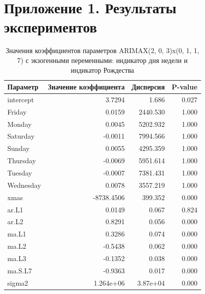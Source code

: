 ﻿

\chapter{Приложение 1. Результаты экспериментов}

\begin{table}%
    \caption{Значения коэффициентов параметров ARIMAX(2, 0, 3)x(0, 1, 1, 7) с экзогенными переменными: индикатор дня недели и индикатор Рождества}
    \centering
    \begin{tabular}{|l|r||r|r|}
        \hline
            Параметр           &     Значение коэффициента  &  Дисперсия  &  P-value \\
        \hline
            intercept          &     3.7294                 &     1.686 &   0.027 \\
            Friday             &     0.0159                 &  2440.530 &   1.000 \\
            Monday             &     0.0045                 &  5202.932 &   1.000 \\
            Saturday           &    -0.0011                 &  7994.566 &   1.000 \\
            Sunday             &     0.0055                 &  4295.359 &   1.000 \\
            Thursday           &    -0.0069                 &  5951.614 &   1.000 \\
            Tuesday            &    -0.0007                 &  7381.431 &   1.000 \\
            Wednesday          &     0.0078                 &  3557.219 &   1.000 \\
            xmas               & -8738.4506                 &   399.352 &   0.000 \\
            ar.L1              &     0.0149                 &     0.067 &   0.824 \\
            ar.L2              &     0.8291                 &     0.056 &   0.000 \\
            ma.L1              &     0.3286                 &     0.074 &   0.000 \\
            ma.L2              &    -0.5438                 &     0.062 &   0.000 \\
            ma.L3              &    -0.1352                 &     0.038 &   0.000 \\
            ma.S.L7            &    -0.9363                 &     0.017 &   0.000 \\
            sigma2             &  1.264e+06                 &  3.87e+04 &   0.000 \\
        \hline
    \end{tabular}
    \label{tbl:arimax_coeffs_exogen}
\end{table}


